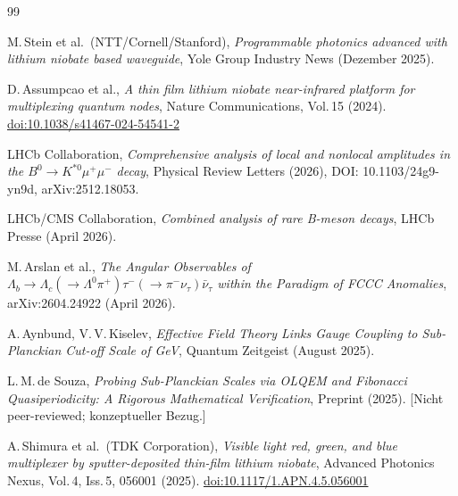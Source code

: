 \begin{thebibliography}{99}

M.\,Stein et al.\ (NTT/Cornell/Stanford),
\textit{Programmable photonics advanced with lithium niobate based waveguide},
Yole Group Industry News (Dezember 2025).

D.\,Assumpcao et al.,
\textit{A thin film lithium niobate near-infrared platform for multiplexing quantum nodes},
Nature Communications, Vol.\,15 (2024).
\href{https://doi.org/10.1038/s41467-024-54541-2}{doi:10.1038/s41467-024-54541-2}

LHCb Collaboration,
\textit{Comprehensive analysis of local and nonlocal amplitudes in the
$B^0 \to K^{*0}\mu^+\mu^-$ decay},
Physical Review Letters (2026),
DOI: 10.1103/24g9-yn9d,
arXiv:2512.18053.

LHCb/CMS Collaboration,
\textit{Combined analysis of rare B-meson decays},
LHCb Presse (April 2026).

M.\,Arslan et al.,
\textit{The Angular Observables of $\Lambda_b \to \Lambda_c(\to \Lambda^0\pi^+)
\tau^-(\to\pi^-\nu_\tau)\bar{\nu}_\tau$ within the Paradigm of FCCC Anomalies},
arXiv:2604.24922 (April 2026).

A.\,Aynbund, V.\,V.\,Kiselev,
\textit{Effective Field Theory Links Gauge Coupling to Sub-Planckian Cut-off Scale of GeV},
Quantum Zeitgeist (August 2025).

L.\,M.\,de Souza,
\textit{Probing Sub-Planckian Scales via OLQEM and Fibonacci Quasiperiodicity:
A Rigorous Mathematical Verification},
Preprint (2025). [Nicht peer-reviewed; konzeptueller Bezug.]

A.\,Shimura et al.\ (TDK Corporation),
\textit{Visible light red, green, and blue multiplexer by sputter-deposited
thin-film lithium niobate},
Advanced Photonics Nexus, Vol.\,4, Iss.\,5, 056001 (2025).
\href{https://doi.org/10.1117/1.APN.4.5.056001}{doi:10.1117/1.APN.4.5.056001}

\end{thebibliography}
